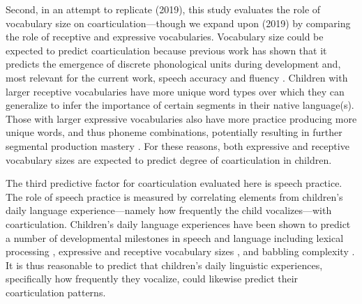 \documentclass[a4paper,man,natbib,donotrepeattitle, apacite]{apa6}
\begin{document}
Second, in an attempt to replicate \citeauthor{noiraySpokenLanguageDevelopment2019} (2019), this study evaluates the role of vocabulary size on coarticulation---though we expand upon \citeauthor{noiraySpokenLanguageDevelopment2019} (2019) by comparing the role of receptive and expressive vocabularies. Vocabulary size could be expected to predict coarticulation because previous work has shown that it predicts the emergence of discrete phonological units during development \cite{edwardsInteractionVocabularySize2004,sosaLexicalPhonologicalEffects2012,stoel-gammonRelationshipsLexicalPhonological2011,storkelLexiconPhonologyInteractions2002} and, most relevant for the current work, speech accuracy and fluency \cite{cychoszLexicalAdvantageFouryearold2020,edwardsInteractionVocabularySize2004,metsalaYoungChildrenPhonological1999,munsonRelationshipsNonwordRepetition2005,zamunerPhonotacticProbabilitiesOnset2009}. Children with larger receptive vocabularies have more unique word types over which they can generalize to infer the importance of certain segments in their native language(s). Those with larger expressive vocabularies also have more practice producing more unique words, and thus phoneme combinations, potentially resulting in further segmental production mastery \cite{beckmanGeneralizingLexiconsPredict2010}. For these reasons, both expressive and receptive vocabulary sizes are expected to predict degree of coarticulation in children. 

The third predictive factor for coarticulation evaluated here is speech practice. The role of speech practice is measured by correlating elements from children’s daily language experience---namely how frequently the child vocalizes---with coarticulation. Children's daily language experiences have been shown to predict a number of developmental milestones in speech and language including lexical processing \cite{weislederTalkingChildrenMatters2013}, expressive and receptive vocabulary sizes \cite{hartMeaningfulDifferencesEveryday1995,hoffSpecificityEnvironmentalInfluence2003,mahrUsingLanguageInput2018}, and babbling complexity \cite{ferjanramirezParentCoaching102019}. It is thus reasonable to predict that children’s daily linguistic experiences, specifically how frequently they vocalize, could likewise predict their coarticulation patterns. 
\end{document}
